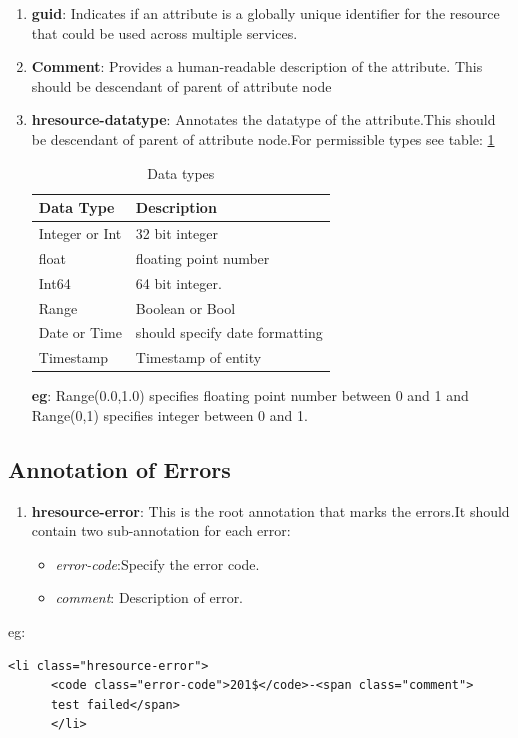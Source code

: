 \begin{spacing}{1.5}
\begin{enumerate}
\item {\bf guid}: Indicates if an attribute is a globally unique identifier for the resource that could be used across multiple services.
\item {\bf Comment}: Provides a human-readable description of the attribute. This should be descendant of parent of attribute node

\item {\bf hresource-datatype}: Annotates the datatype of the attribute.This should be descendant of parent of attribute node.For permissible types see table: \ref{tab:data_types}

\begin{table}
    \centering
    \begin{tabular}{|l|l|}
    \hline
    Data Type      & Description                    \\ \hline
    Integer or Int &  32 bit integer                \\ \hline
    float          & floating point number          \\ \hline
    Int64          &  64 bit integer.               \\ \hline
     Range         &  Boolean or Bool               \\ \hline
    Date or Time   & should specify date formatting \\ \hline
    Timestamp      & Timestamp of entity            \\ \hline
    \end{tabular}
    \caption{Data types}
    \label{tab:data_types}
\end{table}

{\bf eg}: Range(0.0,1.0) specifies floating point number between 0 and 1 and Range(0,1) specifies integer between 0 and 1.
\end{enumerate}

\subsection{Annotation of Errors}

\begin{enumerate}
\item {\bf hresource-error}: This is the root annotation that marks the errors.It should contain two sub-annotation for each error:
\begin{itemize}
\item {\it error-code}:Specify the error code.
\item {\it comment}: Description of error.
\end{itemize}
\end{enumerate}
eg:
\begin{verbatim}
<li class="hresource-error">
      <code class="error-code">201$</code>-<span class="comment">
      test failed</span>
      </li>
\end{verbatim}


\end{spacing}
